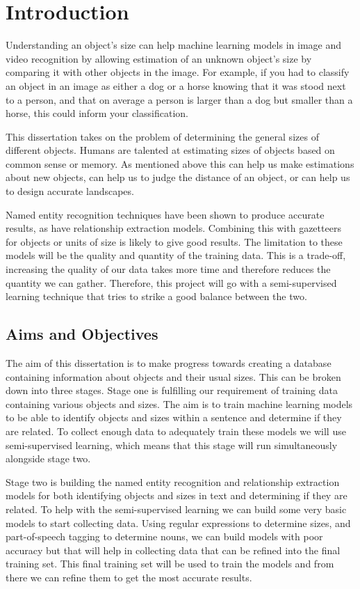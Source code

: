 \chapter{Introduction}

Understanding an object's size can help machine learning models in image and video recognition by allowing estimation of an unknown object's size by comparing it with other objects in the image. For example, if you had to classify an object in an image as either a dog or a horse knowing that it was stood next to a person, and that on average a person is larger than a dog but smaller than a horse, this could inform your classification.

This dissertation takes on the problem of determining the general sizes of different objects. Humans are talented at estimating sizes of objects based on common sense or memory. As mentioned above this can help us make estimations about new objects, can help us to judge the distance of an object, or can help us to design accurate landscapes.

Named entity recognition techniques have been shown to produce accurate results, as have relationship extraction models. Combining this with gazetteers for objects or units of size is likely to give good results. The limitation to these models will be the quality and quantity of the training data. This is a trade-off, increasing the quality of our data takes more time and therefore reduces the quantity we can gather. Therefore, this project will go with a semi-supervised learning technique that tries to strike a good balance between the two. 

\section{Aims and Objectives}

The aim of this dissertation is to make progress towards creating a database containing information about objects and their usual sizes. This can be broken down into three stages. Stage one is fulfilling our requirement of training data containing various objects and sizes. The aim is to train machine learning models to be able to identify objects and sizes within a sentence and determine if they are related. To collect enough data to adequately train these models we will use semi-supervised learning, which means that this stage will run simultaneously alongside stage two.

Stage two is building the named entity recognition and relationship extraction models for both identifying objects and sizes in text and determining if they are related. To help with the semi-supervised learning we can build some very basic models to start collecting data. Using regular expressions to determine sizes, and part-of-speech tagging to determine nouns, we can build models with poor accuracy but that will help in collecting data that can be refined into the final training set. This final training set will be used to train the models and from there we can refine them to get the most accurate results.

